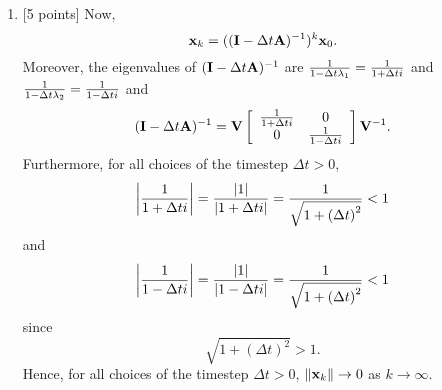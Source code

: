 \begin{solution}
\begin{enumerate}
\item {[5 points]} Now,
\[
{\bf x}_k = (({\bf I}-\Delta t {\bf A})^{-1})^k {\bf x}_0.
\]
Moreover, the eigenvalues of $({\bf I}-\Delta t {\bf A})^{-1}$ are ${1\over1-\Delta t \lambda_1} = {1\over1+\Delta t i}$ and ${1\over1-\Delta t \lambda_2} = {1\over1-\Delta ti}$ and
\[
({\bf I}-\Delta t {\bf A})^{-1}={\bf V} \left[\begin{array}{cc}{1\over1+\Delta t i} & 0 \\ 0 & {1\over1-\Delta ti}\end{array}\right] {\bf V}^{-1}.
\]
Furthermore, for all choices of the timestep $\Delta t>0$,
\[
\left|{1\over1+\Delta t i}\right|={\left|1\right|\over\left|1+\Delta t i\right|}={1\over\sqrt{1+\left(\Delta t\right)^2}}<1
\]
and
\[
\left|{1\over1-\Delta t i}\right|={\left|1\right|\over\left|1-\Delta t i\right|}={1\over\sqrt{1+\left(\Delta t\right)^2}}<1
\]
since
\[
\sqrt{1+\left(\Delta t\right)^2}>1.
\]
Hence, for all choices of the timestep $\Delta t>0$, $\|{\bf x}_k\|\rightarrow0$ as $k\to\infty$.
\end{enumerate}
\end{solution}







